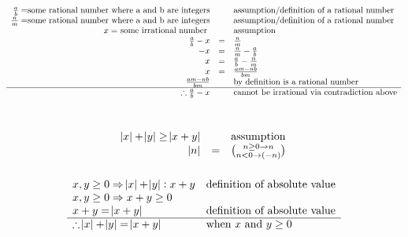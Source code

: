 \documentclass[letterpaper]{article}
\begin{document}
	\section{}
    	\begin{displaymath}
    		\begin{array}{rcl}
    			\frac{a}{b} = $some rational number where a and b are integers$ && 
                	$assumption/definition of a rational number$\\
                \frac{n}{m} = $some rational number where a and b are integers$ && 
                	$assumption/definition of a rational number$\\
                x = $ some irrational number $ && $assumption$\\
                \frac{a}{b} - x &=& \frac{n}{m}\\
                -x &=& \frac{n}{m} - \frac{a}{b}\\
                x &=& \frac{a}{b} - \frac{n}{m}\\
                x &=& \frac{am - nb}{bm}\\
                \frac{am - nb}{bm} && $by definition is a rational number$\\
                \hline
                \therefore \frac{a}{b} - x && $cannot be irrational via contradiction above$\\ 
    		\end{array}
    	\end{displaymath}
	\section{}
    	\begin{displaymath}
    		\begin{array}{rll}
            	\abs{x} + \abs{y} \geq \abs{x + y} && $assumption$\\
    			\abs{n} &=& \binom{n \geq 0 \rightarrow n}{n < 0 \rightarrow (-n)} 
    		\end{array}
    	\end{displaymath}
        \subsubsection{}
        	\begin{displaymath}
        		\begin{array}{ll}
        			x, y \geq 0 \Rightarrow \abs{x} + \abs{y}: x + y & $definition of absolute value$\\
                    x, y \geq 0 \Rightarrow x + y \geq 0 &\\
                    x + y = \abs{x + y} & $definition of absolute value$\\
                    \hline
                    \therefore \abs{x} + \abs{y} = \abs{x + y} & $when $ x $ and $ y \geq 0\\
        		\end{array}
        	\end{displaymath}
\end{document}
